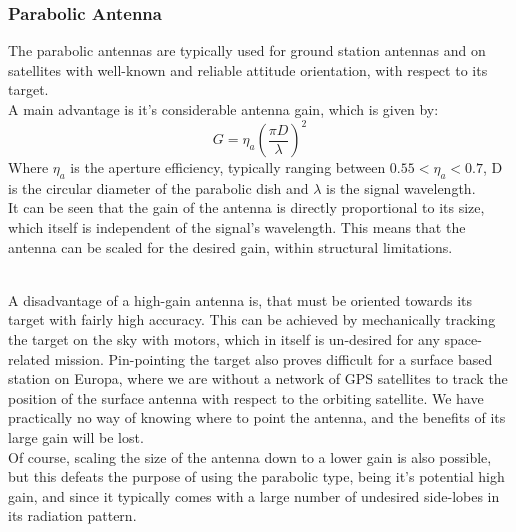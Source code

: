 \subsubsection{Parabolic Antenna}
The parabolic antennas are typically used for ground station antennas and on satellites with well-known and reliable attitude orientation, with respect to its target.\\
A main advantage is it's considerable antenna gain, which is given by:
\begin{equation}
G = \eta_a\left(\frac{\pi D}{\lambda}\right)^2
\end{equation}  
Where $\eta_a$ is the aperture efficiency, typically ranging between $0.55<\eta_a<0.7$, D is the circular diameter of the parabolic dish and $\lambda$ is the signal wavelength.\\
It can be seen that the gain of the antenna is directly proportional to its size, which itself is independent of the signal's wavelength. This means that the antenna can be scaled for the desired gain, within structural limitations. 

\\
A disadvantage of a high-gain antenna is, that must be oriented towards its target with fairly high accuracy. This can be achieved by mechanically tracking the target on the sky with motors, which in itself is un-desired for any space-related mission. Pin-pointing the target also proves difficult for a surface based station on Europa, where we are without a network of GPS satellites to track the position of the surface antenna with respect to the orbiting satellite. We have practically no way of knowing where to point the antenna, and the benefits of its large gain will be lost.\\
Of course, scaling the size of the antenna down to a lower gain is also possible, but this defeats the purpose of using the parabolic type, being it's potential high gain, and since it typically comes with a large number of undesired side-lobes in its radiation pattern. 
